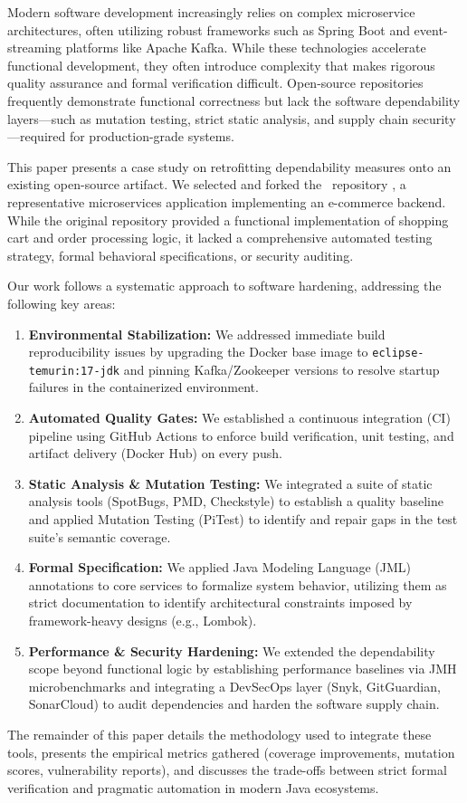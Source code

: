 Modern software development increasingly relies on complex microservice architectures, often utilizing robust frameworks such as Spring Boot and event-streaming platforms like Apache Kafka. While these technologies accelerate functional development, they often introduce complexity that makes rigorous quality assurance and formal verification difficult. Open-source repositories frequently demonstrate functional correctness but lack the software dependability layers—such as mutation testing, strict static analysis, and supply chain security—required for production-grade systems.

This paper presents a case study on retrofitting dependability measures onto an existing open-source artifact. We selected and forked the \repourl\ repository \cite{ecommerceRepo}, a representative microservices application implementing an e-commerce backend. While the original repository provided a functional implementation of shopping cart and order processing logic, it lacked a comprehensive automated testing strategy, formal behavioral specifications, or security auditing.

Our work follows a systematic approach to software hardening, addressing the following key areas:

\begin{enumerate}
    \item \textbf{Environmental Stabilization:} We addressed immediate build reproducibility issues by upgrading the Docker base image to \texttt{eclipse-temurin:17-jdk} and pinning Kafka/Zookeeper versions to resolve startup failures in the containerized environment.
    \item \textbf{Automated Quality Gates:} We established a continuous integration (CI) pipeline using GitHub Actions to enforce build verification, unit testing, and artifact delivery (Docker Hub) on every push.
    \item \textbf{Static Analysis \& Mutation Testing:} We integrated a suite of static analysis tools (SpotBugs, PMD, Checkstyle) to establish a quality baseline and applied Mutation Testing (PiTest) to identify and repair gaps in the test suite's semantic coverage.
    \item \textbf{Formal Specification:} We applied Java Modeling Language (JML) annotations to core services to formalize system behavior, utilizing them as strict documentation to identify architectural constraints imposed by framework-heavy designs (e.g., Lombok).
    \item \textbf{Performance \& Security Hardening:} We extended the dependability scope beyond functional logic by establishing performance baselines via JMH microbenchmarks and integrating a DevSecOps layer (Snyk, GitGuardian, SonarCloud) to audit dependencies and harden the software supply chain.
\end{enumerate}

The remainder of this paper details the methodology used to integrate these tools, presents the empirical metrics gathered (coverage improvements, mutation scores, vulnerability reports), and discusses the trade-offs between strict formal verification and pragmatic automation in modern Java ecosystems.